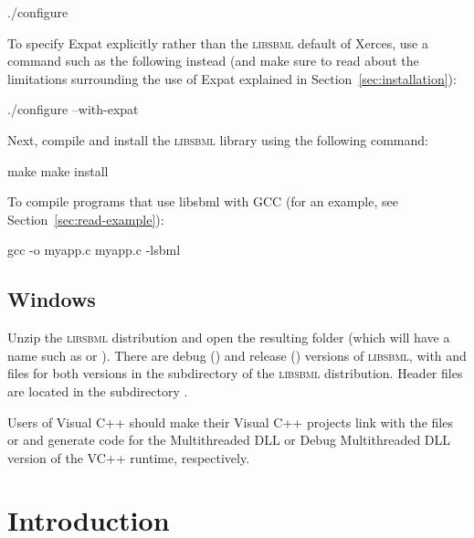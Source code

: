 \documentclass{sbmlmanual}
\newcommand{\libsbml}{\textsc{libsbml}}
\begin{document}
\begin{example}[csh]
  ./configure
\end{example}

To specify Expat explicitly rather than the \libsbml{} default of Xerces,
use a command such as the following instead (and make sure to read about
the limitations surrounding the use of Expat explained in
Section~\ref{sec:installation}):

\begin{example}[csh]
  ./configure --with-expat
\end{example}

Next, compile and install the \libsbml{} library using the following command:

\begin{example}[csh]
  make
  make install
\end{example}

To compile programs that use libsbml with GCC (for an example, see
Section~\ref{sec:read-example}):

\begin{example}[csh]
  gcc -o myapp.c myapp.c -lsbml
\end{example}


\subsection{Windows}

Unzip the \libsbml{} distribution and open the resulting folder (which will
have a name such as  or
).  There are debug () and
release () versions of \libsbml{}, with  and
 files for both versions in the  subdirectory of
the \libsbml{} distribution.  Header files are located in the subdirectory
.

Users of Visual C++ should make their Visual C++ projects link with the
files  or  and generate code for the
Multithreaded DLL or Debug Multithreaded DLL version of the VC++ runtime,
respectively.


\section{Introduction}
\label{sec:introduction}
\end{document}
